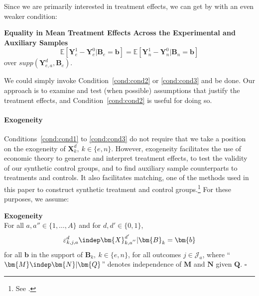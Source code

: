\noindent Since we are primarily interested in treatment effects, we can get by with an even weaker condition:

\onehalfspacing
\begin{condition} \textbf{Equality in Mean Treatment Effects Across the Experimental and Auxiliary Samples \label{cond:cond3}}
\begin{equation}
\mathbb{E} \left[ \bm{Y}_e^1 - \bm{Y}_e^0 | \bm{B}_e = \bm{b} \right] = \mathbb{E} \left[ \bm{Y}_n^1 - \bm{Y}_n^0 | \bm{B}_n = \bm{b} \right]
\end{equation}
over $supp\left(\bm{Y}^d_{e,a}, \bm{B}_e\right)$.\footnotemark
\end{condition}
\doublespacing
We could simply invoke Condition~\ref{cond:cond2} or \ref{cond:cond3} and be done. Our approach is to examine and test (when possible) assumptions that justify the treatment effects, and Condition~\ref{cond:cond2} is useful for doing so.

\paragraph{Exogeneity}

\noindent Conditions~\ref{cond:cond1} to \ref{cond:cond3} do not require that we take a position on the exogeneity of $\bm{X}^d_k, \: k \in \{e,n\}$. However, exogeneity facilitates the use of economic theory to generate and interpret treatment effects, to test the validity of our synthetic control groups, and to find auxiliary sample counterparts to treatments and controls. It also facilitates matching, one of the methods used in this paper to construct synthetic treatment and control groups.\footnote{See \cite{Heckman_Navarro_2004_REStat}.} For these purposes, we assume:

\onehalfspacing
\begin{assumption}\label{ass:exog} \textbf{Exogeneity}\\
For all $a, a'' \in \{ 1, \ldots, A \}$ and for $d, d' \in \{0,1\}$,
\begin{equation}
\varepsilon^d_{k,j,a} \indep \bm{X}^{d^{\prime}}_{k,a^{''}} | \bm{B}_k = \bm{b}
\end{equation}
for all $\bm{b}$ in the support of $\bm{B}_k, \: k \in \{e,n\}$, for all outcomes $j \in \mathcal{J}_{a}$, where ``$\bm{M} \indep \bm{N}|\bm{Q}$'' denotes independence of $\bm{M}$ and $\bm{N}$ given $\bm{Q}$. $\square$
\end{assumption}
\doublespacing


